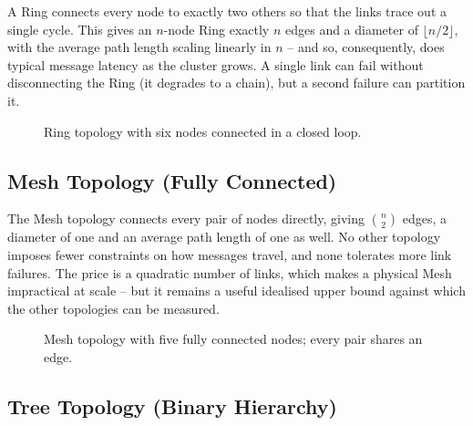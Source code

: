 A Ring connects every node to exactly two others so that the links trace out a single cycle. This gives an $n$-node Ring exactly $n$ edges and a diameter of $\lfloor n/2 \rfloor$, with the average path length scaling linearly in $n$ -- and so, consequently, does typical message latency as the cluster grows. A single link can fail without disconnecting the Ring (it degrades to a chain), but a second failure can partition it.

\begin{figure}[H]
\centering
{}
\caption{Ring topology with six nodes connected in a closed loop.}
\label{fig:topo_ring}
\end{figure}

\subsection{Mesh Topology (Fully Connected)}

The Mesh topology connects every pair of nodes directly, giving $\binom{n}{2}$ edges, a diameter of one and an average path length of one as well. No other topology imposes fewer constraints on how messages travel, and none tolerates more link failures. The price is a quadratic number of links, which makes a physical Mesh impractical at scale -- but it remains a useful idealised upper bound against which the other topologies can be measured.

\begin{figure}[H]
\centering
{}
\caption{Mesh topology with five fully connected nodes; every pair shares an edge.}
\label{fig:topo_mesh}
\end{figure}

\subsection{Tree Topology (Binary Hierarchy)}

